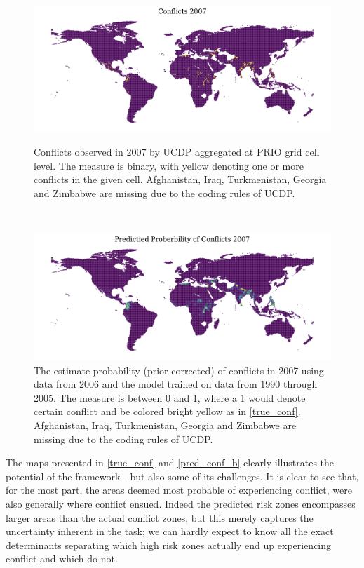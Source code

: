 \documentclass[a4paper]{article}
\begin{document}
\begin{figure}[!htb]
  \centering
  \begin{minipage}[b]{1\textwidth}
    \includegraphics[width=\textwidth]{conflicts_2007.pdf}
    \caption{\footnotesize{Conflicts observed in 2007 by UCDP aggregated at PRIO grid cell level. The measure is binary, with yellow denoting one or more conflicts in the given cell. Afghanistan, Iraq, Turkmenistan, Georgia and Zimbabwe are missing due to the coding rules of UCDP.}}\label{true_conf}
  \end{minipage}
  \\	
  \begin{minipage}[b]{1\textwidth}
    \includegraphics[width=\textwidth]{pred_prob_conflicts_2007_bayes.pdf}
    \caption{\footnotesize{The estimate probability (prior corrected) of conflicts in 2007 using data from 2006 and the model trained on data from 1990 through 2005. The measure is between 0 and 1, where a 1 would denote certain conflict and be colored bright yellow as in \autoref{true_conf}. Afghanistan, Iraq, Turkmenistan, Georgia and Zimbabwe are missing due to the coding rules of UCDP.}}\label{pred_conf_b}
  \end{minipage}
\end{figure}

The maps presented in \autoref{true_conf} and \autoref{pred_conf_b} clearly illustrates the potential of the framework - but also some of its challenges. It is clear to see that, for the most part, the areas deemed most probable of experiencing conflict, were also generally where conflict ensued. Indeed the predicted risk zones encompasses larger areas than the actual conflict zones, but this merely captures the uncertainty inherent in the task; we can hardly expect to know all the exact determinants separating which high risk zones actually end up experiencing conflict and which do not.\par
\end{document}

